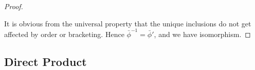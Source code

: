 \begin{proof}
    \begin{center}
    \end{center}
    It is obvious from the universal property that
    the unique inclusions do not get affected by order or bracketing.
    Hence \(\bar{\phi}^{-1} = \bar{\phi}'\),
    and we have isomorphism.
\end{proof}


\subsection*{Direct Product}

